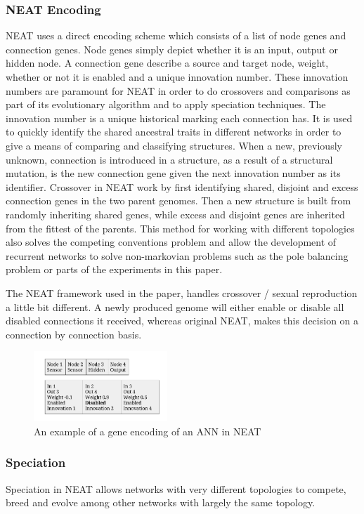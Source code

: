 \subsubsection{NEAT Encoding}
NEAT uses a direct encoding scheme which consists of a list of node genes and connection genes. Node genes simply depict whether it is an input, output or hidden node. A connection gene describe a source and target node, weight, whether or not it is enabled and a unique innovation number.
These innovation numbers are paramount for NEAT in order to do crossovers and comparisons as part of its evolutionary algorithm and to apply speciation techniques. The innovation number is a unique historical marking each connection has. It is used to quickly identify the shared ancestral traits in different networks in order to give a means of comparing and classifying structures. When a new, previously unknown, connection is introduced in a structure, as a result of a structural mutation, is the new connection gene given the next innovation number as its identifier.
Crossover in NEAT work by first identifying shared, disjoint and excess connection genes in the two parent genomes. Then a new structure is built from randomly inheriting shared genes, while excess and disjoint genes are inherited from the fittest of the parents. This method for working with different topologies also solves the competing conventions problem and allow the development of recurrent networks to solve non-markovian problems such as the pole balancing problem or parts of the experiments in this paper.

The NEAT framework used in the paper, handles crossover / sexual reproduction a little bit different. A newly produced genome will either enable or disable all disabled connections it received, whereas original NEAT, makes this decision on a connection by connection basis.

\begin{figure}[H]
	\centering
	\includegraphics[width=190px]{img/genotype.png}
	\caption[NEAT gene encoding]{An example of a gene encoding of an ANN in NEAT}
	\label{fig:genotype}
\end{figure}

\subsubsection{Speciation}
Speciation in NEAT allows networks with very different topologies to compete, breed and evolve among other networks with largely the same topology.

